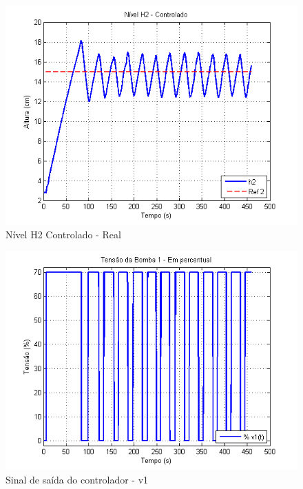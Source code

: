 \begin{figure}[H]
	\centering
	\includegraphics[height=0.35\paperheight,keepaspectratio]{img/ctrl_realh2.png}
	\caption{Nível H2 Controlado - Real}
	\label{imgH2Real}
\end{figure}

\begin{figure}[H]
	\centering
	\includegraphics[height=0.35\paperheight, keepaspectratio]{img/ctrl_realv1.png}
	\caption{\small Sinal de saída do controlador - v1 }
	\label{imgV1Real}
\end{figure}


